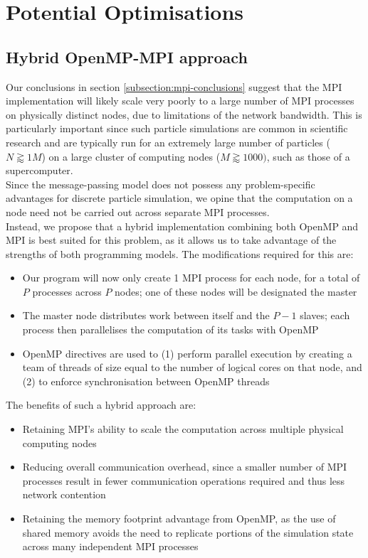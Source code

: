 \documentclass[12pt]{article}
\begin{document}
\pagebreak

\section{Potential Optimisations}

\subsection{Hybrid OpenMP-MPI approach}

Our conclusions in section \ref{subsection:mpi-conclusions} suggest that the MPI implementation will likely scale very poorly to a large number of MPI processes on physically distinct nodes, due to limitations of the network bandwidth. This is particularly important since such particle simulations are common in scientific research and are typically run for an extremely large number of particles ($N \gtrapprox 1M$) on a large cluster of computing nodes ($M \gtrapprox 1000)$, such as those of a supercomputer.\\

Since the message-passing model does not possess any problem-specific advantages for discrete particle simulation, we opine that the computation on a node need not be carried out across separate MPI processes.\\

Instead, we propose that a hybrid implementation combining both OpenMP and MPI is best suited for this problem, as it allows us to take advantage of the strengths of both programming models. The modifications required for this are:
\begin{itemize}
    \item Our program will now only create 1 MPI process for each node, for a total of $P$ processes across $P$ nodes; one of these nodes will be designated the master
    \item The master node distributes work between itself and the $P - 1$ slaves; each process then parallelises the computation of its tasks with OpenMP
    \item OpenMP directives are used to (1) perform parallel execution by creating a team of threads of size equal to the number of logical cores on that node, and (2) to enforce synchronisation between OpenMP threads\\
\end{itemize}

The benefits of such a hybrid approach are:
\begin{itemize}
    \item Retaining MPI's ability to scale the computation across multiple physical computing nodes
    \item Reducing overall communication overhead, since a smaller number of MPI processes result in fewer communication operations required and thus less network contention
    \item Retaining the memory footprint advantage from OpenMP, as the use of shared memory avoids the need to replicate portions of the simulation state across many independent MPI processes
\end{itemize}
\end{document}
